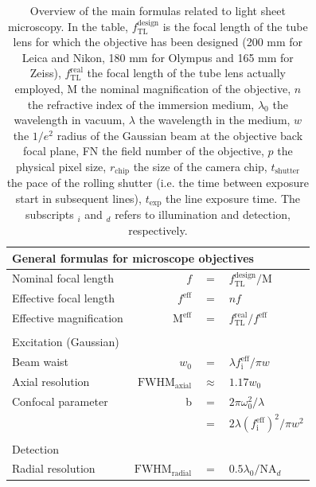 \documentclass[12pt]{spieman}  %
\begin{document}
\begin{table}[t!]
	\centering
		\caption[Main formulas]{Overview of the main formulas related to light sheet microscopy. In the table, $f_{\text{TL}}^{\text{design}}$ is the focal length of the tube lens for which the objective has been designed (200 mm for Leica and Nikon, 180 mm for Olympus and 165 mm for Zeiss), $f_{\text{TL}}^{\text{real}}$ the focal length of the tube lens actually employed, $\text{M}$ the nominal magnification of the objective, $n$ the refractive index of the immersion medium, $\lambda_0$ the wavelength in vacuum, $\lambda$ the wavelength in the medium, $w$ the $1/e^2$ radius of the Gaussian beam at the objective back focal plane, FN the field number of the objective, $p$ the physical pixel size, $r_{\text{chip}}$ the size of the camera chip, $t_{\text{shutter}}$ the pace of the rolling shutter (i.e. the time between exposure start in subsequent lines), $ t_{\text{exp}}$ the line exposure time. The subscripts $_i$ and $_d$ refers to illumination and detection, respectively. \label{tab:resolution}}
		\begin{tabular}{lrcl}
		\\
		\multicolumn{4}{l}{General formulas for microscope objectives}\\\hline\hline 
		Nominal focal length							& $f$ 													& $=$					& $f_{\text{TL}}^{\text{design}}/\text{M}$				\\	
		Effective focal length						& $f^{\text{eff}}$							& $=$					& $nf$													\\
		Effective magnification						& $\text{M}^{\text{eff}}$				& $=$					& $f_{\text{TL}}^{\text{real}}/f^{\text{eff}}$			\\\\
		\multicolumn{4}{l}{Excitation (Gaussian)}\\\hline\hline	
		Beam waist												&$w_0$													& $=$ 				& $ \lambda f_{\text{i}}^{\text{eff}} / \pi w$				\\
		Axial resolution									&$\text{FWHM}_{\text{axial}}$		& $\approx$   & $ 1.17 w_0 $											\\
		Confocal parameter								& b															& $=$  				& $2 \pi \omega_0^2 / \lambda$							\\
																			&  															& $=$   			& $2 \lambda {(f_{\text{i}}^{\text{eff}})}^2 / \pi w^2 $	\\\\
		\multicolumn{4}{l}{Detection}\\\hline\hline  
		Radial resolution									&$\text{FWHM}_{\text{radial}}$	& $=$					& $0.5 \lambda_0 / \text{NA}_{d}$						\\

\end{tabular}
\end{table}
\end{document}
